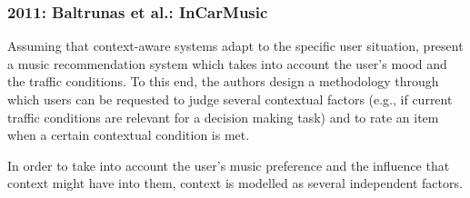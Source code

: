 \subsubsection{2011: Baltrunas et al.: InCarMusic}
\label{sec:baltrunas}

Assuming that context-aware systems adapt to the specific user situation,
\citet{baltrunas_incarmusic_2011} present a music recommendation system which
takes into account the user's mood and the traffic conditions. To this end, the 
authors design a methodology through which users can be requested to judge several
contextual factors (e.g., if current traffic conditions are relevant for a decision
making task) and to rate an item when a certain contextual condition is met. 

In order to take into account the user's music preference and the influence that
context might have into them, context is modelled as several independent factors.
% 
%   
